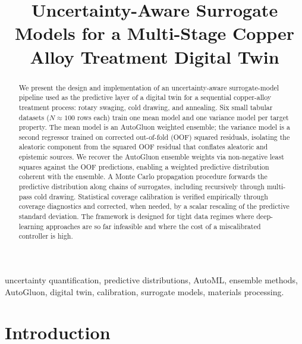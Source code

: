 \documentclass[conference]{IEEEtran}
\begin{document}
\title{Uncertainty-Aware Surrogate Models for a Multi-Stage Copper Alloy Treatment Digital Twin}

\author{
}

\maketitle

\begin{abstract}
We present the design and implementation of an uncertainty-aware surrogate-model pipeline used as the predictive layer of a digital twin for a sequential copper-alloy treatment process: rotary swaging, cold drawing, and annealing. Six small tabular datasets ($N \approx 100$ rows each) train one mean model and one variance model per target property. The mean model is an AutoGluon weighted ensemble; the variance model is a second regressor trained on corrected out-of-fold (OOF) squared residuals, isolating the aleatoric component from the squared OOF residual that conflates aleatoric and epistemic sources. We recover the AutoGluon ensemble weights via non-negative least squares against the OOF predictions, enabling a weighted predictive distribution coherent with the ensemble. A Monte Carlo propagation procedure forwards the predictive distribution along chains of surrogates, including recursively through multi-pass cold drawing. Statistical coverage calibration is verified empirically through coverage diagnostics and corrected, when needed, by a scalar rescaling of the predictive standard deviation. The framework is designed for tight data regimes where deep-learning approaches are so far infeasible and where the cost of a miscalibrated controller is high.
\end{abstract}

\begin{IEEEkeywords}
uncertainty quantification, predictive distributions, AutoML, ensemble methods, AutoGluon, digital twin, calibration, surrogate models, materials processing.
\end{IEEEkeywords}

\section{Introduction}
\end{document}
